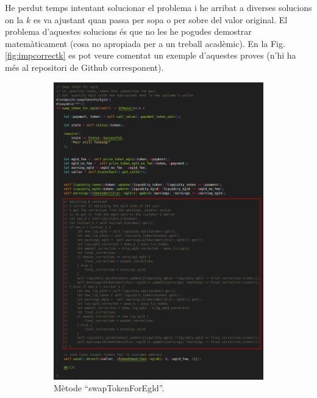 \documentclass[11pt,a4paper]{article}
\begin{document}
He perdut temps intentant solucionar el problema i he arribat a diverses solucions on la \(k\) es va ajustant quan passa per sopa o per sobre del valor original. El problema d'aquestes solucions és que no les he pogudes demostrar matemàticament (cosa no apropiada per a un treball acadèmic). En la Fig. \ref{fig:impcorrectk} es pot veure comentat un exemple d'aquestes proves (n'hi ha més al repositori de Github corresponent).

\begin{figure}[!htb]
\begin{subfigure}[b]{0.47\textwidth}
  \includegraphics[width=\linewidth]{imp-sc01.png}
  \caption{Mètode ``swapTokenForEgld''.}\label{fig:impsc01}
\end{subfigure}\hfill
\begin{subfigure}[b]{0.47\textwidth}

\end{subfigure}
\end{figure}
\end{document}
